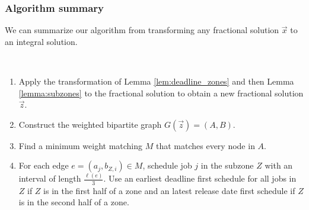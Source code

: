 \subsubsection{Algorithm summary}

We can summarize our algorithm from transforming any fractional solution $\vec{x}$ to an integral solution.

\begin{alg}\label{alg:singleproc}
~
\begin{enumerate}
\item Apply the transformation of Lemma \ref{lem:deadline_zones} and then Lemma \ref{lemma:subzones} to the fractional solution to obtain a new fractional solution $\vec{z}$.
\item Construct the weighted bipartite graph $G(\vec{z}) = (A,B)$.
\item Find a minimum weight matching $M$ that matches every node in $A$.
\item For each edge $e = (a_j, b_{Z, i}) \in M$, schedule job $j$ in the subzone $Z$ with an interval of length $\frac{\ell(e)}{3}$. Use an earliest deadline first schedule for all jobs in $Z$ if $Z$ is in the first half of a zone and an latest release date first schedule if $Z$ is in the second half of a zone.
\end{enumerate}

\end{alg}
